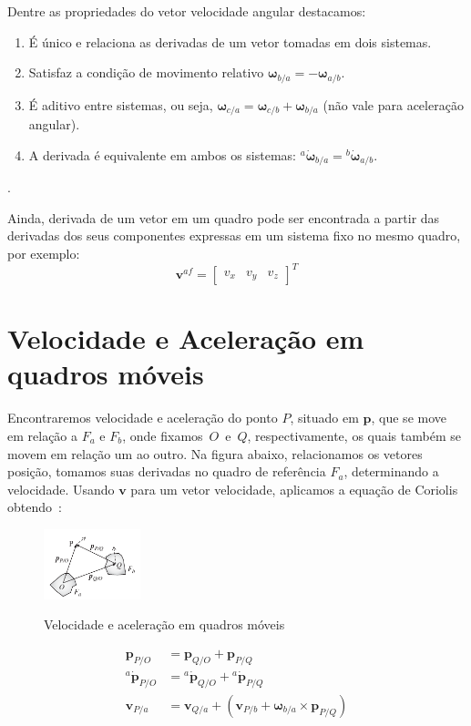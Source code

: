 Dentre as propriedades do vetor velocidade angular destacamos\footnotemark{}:
\begin{enumerate}[label=\alph*)]
\item É único e relaciona as derivadas de um vetor tomadas em dois sistemas.
\item Satisfaz a condição de movimento relativo \(\mathbf{\omega}_{b/a} = - \mathbf{\omega}_{a/b}\).
\item É aditivo entre sistemas, ou seja, \(\mathbf{\omega}_{c/a} = \!\mathbf{\omega}_{c/b} + \mathbf{\omega}_{b/a}\) (não vale para aceleração angular).
\item A derivada é equivalente em ambos os sistemas: \({^{a}\dot{\mathbf{\omega}}_{b/a}} = {^{b}\dot{\mathbf{\omega}}_{a/b}} \).
\end{enumerate}
.

Ainda, derivada de um vetor em um quadro pode ser encontrada a partir das derivadas dos seus componentes expressas em um sistema fixo no mesmo quadro, por exemplo:
\begin{equation*}
    \mathbf{v}^{a\!f} = \begin{bmatrix} v_{x} & v_{y} & v_{z} \end{bmatrix}^{T}
\end{equation*}

\section{Velocidade e Aceleração em quadros móveis}

Encontraremos velocidade e aceleração do ponto \(P\), situado em \(\mathbf{p}\), que se move em relação a \(F_{a}\) e \(F_{b}\), onde fixamos~\(O\)~e~\(Q\), respectivamente, os quais também se movem em relação um ao outro. Na figura abaixo, relacionamos os vetores posição, tomamos suas derivadas no quadro de referência\footnotemark{} \(F_{a}\),  determinando a velocidade. Usando \(\mathbf{v}\) para um vetor velocidade, aplicamos a equação de Coriolis obtendo~\cite{Stevens2016}:
\begin{figure}[H]
    \centering
    \includegraphics[width=0.25\textwidth, keepaspectratio]{figuras/figure1.5-1.png}\label{fig1.5-1}
    \caption{Velocidade e aceleração em quadros móveis}
\end{figure}
\begin{align}
    \mathbf{p}_{P/O}             &= \mathbf{p}_{Q/O} + \mathbf{p}_{P/Q} \label{eq:1.5-1} \\
    {^{a}\dot{\mathbf{p}}_{P/O}} &= {^{a}\dot{\mathbf{p}}_{Q/O}} + {^{a}\dot{\mathbf{p}}_{P/Q}} \label{eq:1.5-2} \\
    \mathbf{v}_{P/a}             &= \mathbf{v}_{Q/a} + \left( \mathbf{v}_{P/b} + \mathbf{\omega}_{b/a}\!\times\!\mathbf{p}_{P/Q} \right) \label{eq:1.5-3}
\end{align}

